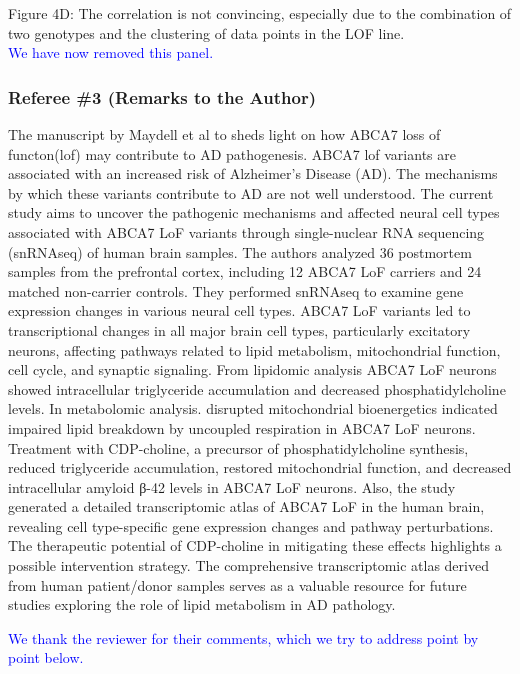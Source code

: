 \documentclass[12pt]{article}
\begin{document}
Figure 4D: The correlation is not convincing, especially due to the combination of two genotypes and the clustering of data points in the LOF line.\\
\textcolor{blue}{We have now removed this panel.}

 \clearpage
\subsubsection{Referee \#3 (Remarks to the Author)}
The manuscript by Maydell et al to sheds light on how ABCA7 loss of functon(lof) may contribute to AD pathogenesis. ABCA7 lof variants are associated with an increased risk of Alzheimer's Disease (AD). The mechanisms by which these variants contribute to AD are not well understood. The current study aims to uncover the pathogenic mechanisms and affected neural cell types associated with ABCA7 LoF variants through single-nuclear RNA sequencing (snRNAseq) of human brain samples. The authors analyzed 36 postmortem samples from the prefrontal cortex, including 12 ABCA7 LoF carriers and 24 matched non-carrier controls. They performed snRNAseq to examine gene expression changes in various neural cell types. ABCA7 LoF variants led to transcriptional changes in all major brain cell types, particularly excitatory neurons, affecting pathways related to lipid metabolism, mitochondrial function, cell cycle, and synaptic signaling. From lipidomic analysis ABCA7 LoF neurons showed intracellular triglyceride accumulation and decreased phosphatidylcholine levels. In metabolomic analysis. disrupted mitochondrial bioenergetics indicated impaired lipid breakdown by uncoupled respiration in ABCA7 LoF neurons. Treatment with CDP-choline, a precursor of phosphatidylcholine synthesis, reduced triglyceride accumulation, restored mitochondrial function, and decreased intracellular amyloid β-42 levels in ABCA7 LoF neurons. Also, the study generated a detailed transcriptomic atlas of ABCA7 LoF in the human brain, revealing cell type-specific gene expression changes and pathway perturbations. The therapeutic potential of CDP-choline in mitigating these effects highlights a possible intervention strategy. The comprehensive transcriptomic atlas derived from human patient/donor samples serves as a valuable resource for future studies exploring the role of lipid metabolism in AD pathology.

\textcolor{blue}{We thank the reviewer for their comments, which we try to address point by point below.}
\end{document}
